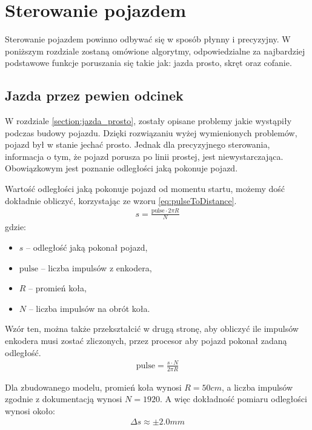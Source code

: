 \section{Sterowanie pojazdem}
    Sterowanie pojazdem powinno odbywać się w sposób płynny i precyzyjny.
    W poniższym rozdziale zostaną omówione algorytmy, odpowiedzialne za najbardziej podstawowe funkcje poruszania się takie jak: jazda prosto, skręt oraz cofanie.

    \subsection{Jazda przez pewien odcinek}
    \label{subsec:jazda_przez_odcinek}
        W rozdziale \ref{section:jazda_prosto}, zostały opisane problemy jakie wystąpiły podczas budowy pojazdu. %
        Dzięki rozwiązaniu wyżej wymienionych problemów, pojazd był w stanie jechać prosto.
        Jednak dla precyzyjnego sterowania, informacja o tym, że pojazd porusza po linii prostej, jest niewystarczająca.
        Obowiązkowym jest poznanie odległości jaką pokonuje pojazd.

        Wartość odległości jaką pokonuje pojazd od momentu startu, możemy dość dokładnie obliczyć, korzystając ze wzoru \eqref{eq:pulseToDistance}.
        \begin{gather}
            s = \frac{\text{pulse} \cdot 2\pi R}{N}
            \label{eq:pulseToDistance}
        \end{gather}
        gdzie:
        \begin{itemize}
            \item $s$ -- odległość jaką pokonał pojazd,
            \item $\text{pulse}$ -- liczba impulsów z enkodera,
            \item $R$ -- promień koła,
            \item $N$ -- liczba impulsów na obrót koła.
        \end{itemize}

        Wzór ten, można także przekształcić w drugą stronę, aby obliczyć ile impulsów enkodera musi zostać zliczonych, przez procesor aby pojazd pokonał zadaną odległość.
        \begin{gather}
            \text{pulse} = \frac{s \cdot N}{2\pi R}
            \label{eq:distanceToPulse}
        \end{gather}

        Dla zbudowanego modelu, promień koła wynosi $R = 50cm$, a liczba impulsów zgodnie z dokumentacją wynosi $N = 1920$.
        A więc dokładność pomiaru odległości wynosi około:
        \begin{gather}
            \Delta s \approx \pm2.0mm
        \end{gather}


